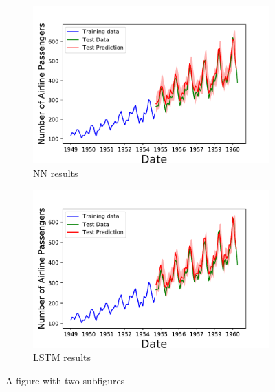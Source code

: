 \documentclass[10pt,a4paper]{article}
\begin{document}
\begin{figure}[h]
\centering
\begin{subfigure}{.5\textwidth}
  \centering
  \includegraphics[scale=0.41]{Airline_Passengers_NN.pdf}
  \caption{NN results}
  \label{fig:sub1}
\end{subfigure}%
\begin{subfigure}{.5\textwidth}
  \centering
  \includegraphics[scale=0.41]{Airline_Passengers_LSTN.pdf}
  \caption{LSTM results}
  \label{fig:sub2}
\end{subfigure}
\caption{A figure with two subfigures}
\label{fig:test}
\end{figure}
\end{document}
